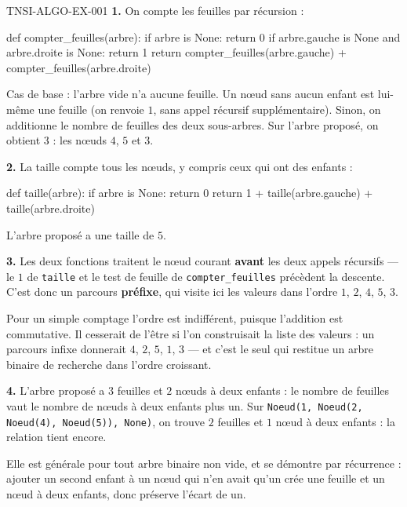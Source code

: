 \begin{corrige}{TNSI-ALGO-EX-001}
\textbf{1.} On compte les feuilles par récursion :
\begin{python}
def compter_feuilles(arbre):
    if arbre is None:
        return 0
    if arbre.gauche is None and arbre.droite is None:
        return 1
    return compter_feuilles(arbre.gauche) + compter_feuilles(arbre.droite)
\end{python}
Cas de base : l'arbre vide n'a aucune feuille. Un n\oe{}ud sans aucun enfant est
lui-même une feuille (on renvoie $1$, sans appel récursif supplémentaire).
Sinon, on additionne le nombre de feuilles des deux sous-arbres. Sur l'arbre
proposé, on obtient $3$ : les n\oe{}uds $4$, $5$ et $3$.

\textbf{2.} La taille compte tous les n\oe{}uds, y compris ceux qui ont des
enfants :
\begin{python}
def taille(arbre):
    if arbre is None:
        return 0
    return 1 + taille(arbre.gauche) + taille(arbre.droite)
\end{python}
L'arbre proposé a une taille de $5$.

\textbf{3.} Les deux fonctions traitent le n\oe{}ud courant \textbf{avant} les
deux appels récursifs — le $1$ de \lstinline{taille} et le test de feuille de
\lstinline{compter_feuilles} précèdent la descente. C'est donc un parcours
\textbf{préfixe}, qui visite ici les valeurs dans l'ordre
$1$, $2$, $4$, $5$, $3$.

Pour un simple comptage l'ordre est indifférent, puisque l'addition est
commutative. Il cesserait de l'être si l'on construisait la liste des valeurs :
un parcours infixe donnerait $4$, $2$, $5$, $1$, $3$ — et c'est le seul qui
restitue un arbre binaire de recherche dans l'ordre croissant.

\textbf{4.} L'arbre proposé a $3$ feuilles et $2$ n\oe{}uds à deux enfants : le
nombre de feuilles vaut le nombre de n\oe{}uds à deux enfants plus un. Sur
\lstinline{Noeud(1, Noeud(2, Noeud(4), Noeud(5)), None)}, on trouve $2$ feuilles
et $1$ n\oe{}ud à deux enfants : la relation tient encore.

Elle est générale pour tout arbre binaire non vide, et se démontre par
récurrence : ajouter un second enfant à un n\oe{}ud qui n'en avait qu'un crée une
feuille et un n\oe{}ud à deux enfants, donc préserve l'écart de un.
\end{corrige}
